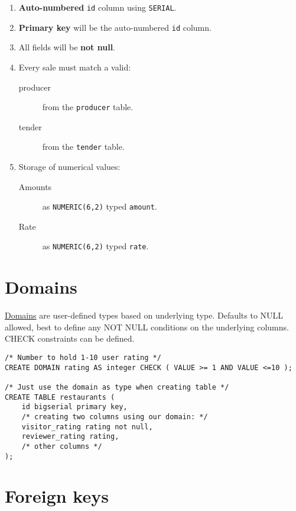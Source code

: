 \documentclass[slides]{pgnotes}
\begin{document}
\begin{enumerate}
\item \textbf{Auto-numbered} \texttt{id} column using \texttt{SERIAL}.
\item \textbf{Primary key} will be the auto-numbered \texttt{id} column.
\item All fields will be \textbf{not null}.
\item Every sale must match a valid:
  \begin{description}
  \item[producer] from the \texttt{producer} table.
  \item[tender] from the \texttt{tender} table.
  \end{description}
\item Storage of numerical values:
  \begin{description}
  \item[Amounts] as \texttt{NUMERIC(6,2)} typed \texttt{amount}.
  \item[Rate] as \texttt{NUMERIC(6,2)} typed \texttt{rate}. 
  \end{description}
\end{enumerate}

\section{Domains}\label{sec:domains}

\href{https://www.postgresql.org/docs/13/domains.html}{Domains} are
user-defined types based on underlying type. Defaults to NULL allowed,
best to define any NOT NULL conditions on the underlying columns. CHECK
constraints can be defined.

\begin{verbatim}
/* Number to hold 1-10 user rating */
CREATE DOMAIN rating AS integer CHECK ( VALUE >= 1 AND VALUE <=10 );

/* Just use the domain as type when creating table */
CREATE TABLE restaurants (
    id bigserial primary key,
    /* creating two columns using our domain: */
    visitor_rating rating not null,
    reviewer_rating rating, 
    /* other columns */
);
\end{verbatim}



\section{Foreign keys}\label{foreign-keys}
\end{document}
